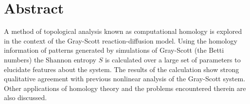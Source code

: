     \chapter*{Abstract}

A method of topological analysis known as computational homology is explored in the context of the Gray-Scott reaction-diffusion model. Using the homology information of patterns generated by simulations of Gray-Scott (the Betti numbers) the Shannon entropy $S$ is calculated over a large set of parameters to elucidate features about the system. The results of the calculation show strong qualitative agreement with previous nonlinear analysis of the Gray-Scott system. Other applications of homology theory and the problems encountered therein are also discussed.